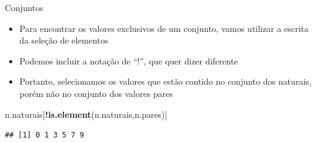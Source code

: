\documentclass[
  10pt,
  ignorenonframetext,
]{beamer}
\newenvironment{Shaded}{\begin{snugshade}}{\end{snugshade}}
\newcommand{\KeywordTok}[1]{\textcolor[rgb]{0.13,0.29,0.53}{\textbf{#1}}}
\newcommand{\NormalTok}[1]{#1}
\newcommand{\OperatorTok}[1]{\textcolor[rgb]{0.81,0.36,0.00}{\textbf{#1}}}
\providecommand{\tightlist}{%
  \setlength{\itemsep}{0pt}\setlength{\parskip}{0pt}}
\begin{document}
\begin{frame}[fragile]{Conjuntos}
\protect\hypertarget{conjuntos-2}{}
\begin{itemize}
\tightlist
\item
  Para encontrar os valores exclusivos de um conjunto, vamos utilizar a
  escrita da seleção de elementos
\item
  Podemos incluir a notação de ``!'', que quer dizer diferente
\item
  Portanto, selecionamos os valores que estão contido no conjunto dos
  naturais, porém não no conjunto dos valores pares
\end{itemize}

\begin{Shaded}
\begin{Highlighting}[]
\NormalTok{n.naturais[}\OperatorTok{!}\KeywordTok{is.element}\NormalTok{(n.naturais,n.pares)]}
\end{Highlighting}
\end{Shaded}

\begin{verbatim}
## [1] 0 1 3 5 7 9
\end{verbatim}
\end{frame}
\end{document}
